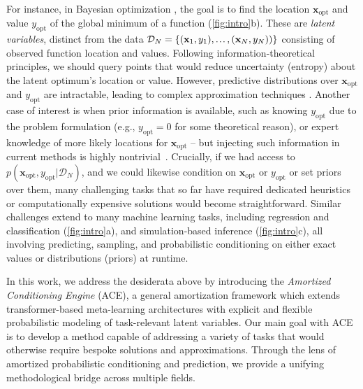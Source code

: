 \documentclass[twoside]{article}
\renewcommand{\ldots}{\mathinner{.\mkern1.5mu.\mkern1.5mu.}}
\newcommand{\x}{\mathbf{x}}
\newcommand{\data}{\mathcal{D}}
\newcommand{\xopt}{\x_\text{opt}}
\newcommand{\yopt}{y_\text{opt}}
\begin{document}
For instance, in Bayesian optimization \citep{garnett2023bayesian}, the goal is to find the location $\xopt$ and value $\yopt$ of the global minimum of a function (\cref{fig:intro}b). These are \emph{latent variables}, distinct from the data $\data_N = \{(\x_1, y_1), \ldots, (\x_N, y_N))\}$ consisting of observed function location and values. Following information-theoretical principles, we should query points that would reduce uncertainty (entropy) about the latent optimum's location or value.
However, predictive distributions over $\xopt$ and $\yopt$ are intractable, leading to complex approximation techniques \citep{hennig2012entropy, hernandez2014predictive, wang2017max}.
%
Another case of interest is when prior information is available, such as knowing $\yopt$ due to the problem formulation (e.g., $\yopt = 0$ for some theoretical reason), or expert knowledge of more likely locations for $\xopt$ -- but injecting such information in current methods is highly nontrivial~\citep{nguyen2020knowing, souza2021bayesian,hvarfner2022pi}. Crucially, if we had access to $p(\xopt, \yopt | \data_N)$, and we could likewise condition on $\xopt$ or $\yopt$ or set priors over them, many challenging tasks that so far have required dedicated heuristics or computationally expensive solutions would become straightforward.
%
%
Similar challenges extend to many machine learning tasks, including regression and classification (\cref{fig:intro}a), and simulation-based inference (\cref{fig:intro}c),  all involving predicting, sampling, and probabilistic conditioning on either exact values or distributions (priors) at runtime.

In this work, we address the desiderata above by introducing the \emph{Amortized Conditioning Engine} (ACE), a general amortization framework which extends transformer-based meta-learning architectures \citep{nguyen2022transformer, muller2022transformers} with explicit and flexible probabilistic modeling of task-relevant latent variables.
Our main goal with ACE is to develop a method capable of addressing a variety of tasks that would otherwise require bespoke solutions and approximations. Through the lens of amortized probabilistic conditioning and prediction, we provide a unifying methodological bridge across multiple fields.

\vspace{-0.25em}
\end{document}

